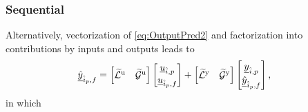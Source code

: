 \subsubsection{Sequential}
Alternatively, vectorization of \eqref{eq:OutputPred2} and factorization into contributions by inputs and outputs leads to
\begin{align}\label{eq:Sequential1}
    \underline{\hat{y}}_{\hat{i}_p,f} &=
    \begin{bmatrix}
        \widetilde{\mathcal{L}}^\mathrm{u} & \widetilde{\mathcal{G}}^\mathrm{u} 
    \end{bmatrix}    
    \begin{bmatrix}
        \underline{u}_{\hat{i},p}\\
        \underline{u}_{\hat{i}_p,f}
    \end{bmatrix}+
    \begin{bmatrix}
        \widetilde{\mathcal{L}}^\mathrm{y} & \widetilde{\mathcal{G}}^\mathrm{y} 
    \end{bmatrix}    
    \begin{bmatrix}
        \underline{y}_{\hat{i},p}\\
        \underline{\hat{y}}_{\hat{i}_p,f}
    \end{bmatrix},
\end{align}
in which
